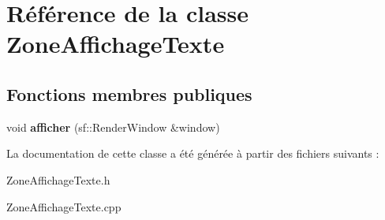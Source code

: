 \hypertarget{classZoneAffichageTexte}{\section{\-Référence de la classe \-Zone\-Affichage\-Texte}
\label{classZoneAffichageTexte}
}
\subsection*{\-Fonctions membres publiques}
\begin{DoxyCompactItemize}
\item 
\hypertarget{classZoneAffichageTexte_a209bb3c8fe4790b63326aee7066aca28}{void {\bfseries afficher} (sf\-::\-Render\-Window \&window)}\label{classZoneAffichageTexte_a209bb3c8fe4790b63326aee7066aca28}

\end{DoxyCompactItemize}


\-La documentation de cette classe a été générée à partir des fichiers suivants \-:\begin{DoxyCompactItemize}
\item 
\-Zone\-Affichage\-Texte.\-h\item 
\-Zone\-Affichage\-Texte.\-cpp\end{DoxyCompactItemize}
